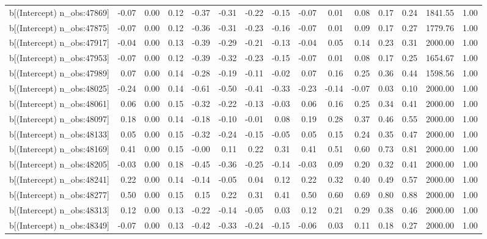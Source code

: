 \begin{table}[ht]
\begin{tabular}{rrrrrrrrrrrrrrr}
  b[(Intercept) n\_obs:47869] & -0.07 & 0.00 & 0.12 & -0.37 & -0.31 & -0.22 & -0.15 & -0.07 & 0.01 & 0.08 & 0.17 & 0.24 & 1841.55 & 1.00 \\ 
  b[(Intercept) n\_obs:47875] & -0.07 & 0.00 & 0.12 & -0.36 & -0.31 & -0.23 & -0.16 & -0.07 & 0.01 & 0.09 & 0.17 & 0.27 & 1779.76 & 1.00 \\ 
  b[(Intercept) n\_obs:47917] & -0.04 & 0.00 & 0.13 & -0.39 & -0.29 & -0.21 & -0.13 & -0.04 & 0.05 & 0.14 & 0.23 & 0.31 & 2000.00 & 1.00 \\ 
  b[(Intercept) n\_obs:47953] & -0.07 & 0.00 & 0.12 & -0.39 & -0.32 & -0.23 & -0.15 & -0.07 & 0.01 & 0.08 & 0.17 & 0.25 & 1654.67 & 1.00 \\ 
  b[(Intercept) n\_obs:47989] & 0.07 & 0.00 & 0.14 & -0.28 & -0.19 & -0.11 & -0.02 & 0.07 & 0.16 & 0.25 & 0.36 & 0.44 & 1598.56 & 1.00 \\ 
  b[(Intercept) n\_obs:48025] & -0.24 & 0.00 & 0.14 & -0.61 & -0.50 & -0.41 & -0.33 & -0.23 & -0.14 & -0.07 & 0.03 & 0.10 & 2000.00 & 1.00 \\ 
  b[(Intercept) n\_obs:48061] & 0.06 & 0.00 & 0.15 & -0.32 & -0.22 & -0.13 & -0.03 & 0.06 & 0.16 & 0.25 & 0.34 & 0.41 & 2000.00 & 1.00 \\ 
  b[(Intercept) n\_obs:48097] & 0.18 & 0.00 & 0.14 & -0.18 & -0.10 & -0.01 & 0.08 & 0.19 & 0.28 & 0.37 & 0.46 & 0.55 & 2000.00 & 1.00 \\ 
  b[(Intercept) n\_obs:48133] & 0.05 & 0.00 & 0.15 & -0.32 & -0.24 & -0.15 & -0.05 & 0.05 & 0.15 & 0.24 & 0.35 & 0.47 & 2000.00 & 1.00 \\ 
  b[(Intercept) n\_obs:48169] & 0.41 & 0.00 & 0.15 & -0.00 & 0.11 & 0.22 & 0.31 & 0.41 & 0.51 & 0.60 & 0.73 & 0.81 & 2000.00 & 1.00 \\ 
  b[(Intercept) n\_obs:48205] & -0.03 & 0.00 & 0.18 & -0.45 & -0.36 & -0.25 & -0.14 & -0.03 & 0.09 & 0.20 & 0.32 & 0.41 & 2000.00 & 1.00 \\ 
  b[(Intercept) n\_obs:48241] & 0.22 & 0.00 & 0.14 & -0.14 & -0.05 & 0.04 & 0.12 & 0.22 & 0.32 & 0.40 & 0.49 & 0.57 & 2000.00 & 1.00 \\ 
  b[(Intercept) n\_obs:48277] & 0.50 & 0.00 & 0.15 & 0.15 & 0.22 & 0.31 & 0.41 & 0.50 & 0.60 & 0.69 & 0.80 & 0.88 & 2000.00 & 1.00 \\ 
  b[(Intercept) n\_obs:48313] & 0.12 & 0.00 & 0.13 & -0.22 & -0.14 & -0.05 & 0.03 & 0.12 & 0.21 & 0.29 & 0.38 & 0.46 & 2000.00 & 1.00 \\ 
  b[(Intercept) n\_obs:48349] & -0.07 & 0.00 & 0.13 & -0.42 & -0.33 & -0.24 & -0.15 & -0.06 & 0.03 & 0.11 & 0.18 & 0.27 & 2000.00 & 1.00 \\ 

\end{tabular}
\end{table}
